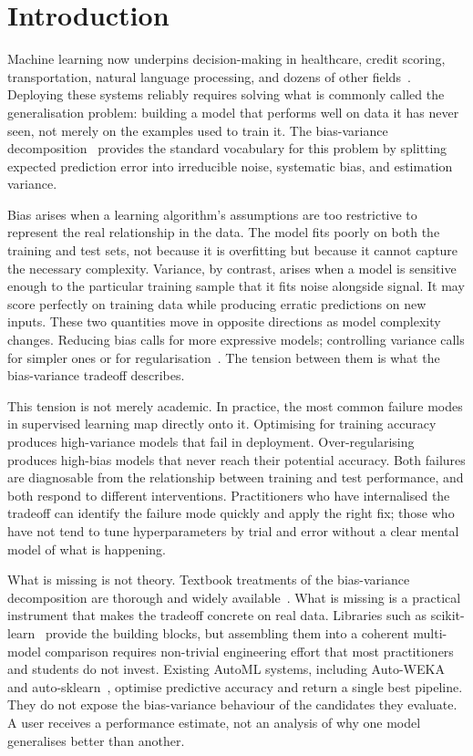 \documentclass[conference]{IEEEtran}
\begin{document}
\section{Introduction}

Machine learning now underpins decision-making in healthcare, credit scoring, transportation, natural language processing, and dozens of other fields~\cite{b26}. Deploying these systems reliably requires solving what is commonly called the generalisation problem: building a model that performs well on data it has never seen, not merely on the examples used to train it. The bias-variance decomposition~\cite{b1} provides the standard vocabulary for this problem by splitting expected prediction error into irreducible noise, systematic bias, and estimation variance.

Bias arises when a learning algorithm's assumptions are too restrictive to represent the real relationship in the data. The model fits poorly on both the training and test sets, not because it is overfitting but because it cannot capture the necessary complexity. Variance, by contrast, arises when a model is sensitive enough to the particular training sample that it fits noise alongside signal. It may score perfectly on training data while producing erratic predictions on new inputs. These two quantities move in opposite directions as model complexity changes. Reducing bias calls for more expressive models; controlling variance calls for simpler ones or for regularisation~\cite{b2}. The tension between them is what the bias-variance tradeoff describes.

This tension is not merely academic. In practice, the most common failure modes in supervised learning map directly onto it. Optimising for training accuracy produces high-variance models that fail in deployment. Over-regularising produces high-bias models that never reach their potential accuracy. Both failures are diagnosable from the relationship between training and test performance, and both respond to different interventions. Practitioners who have internalised the tradeoff can identify the failure mode quickly and apply the right fix; those who have not tend to tune hyperparameters by trial and error without a clear mental model of what is happening.

What is missing is not theory. Textbook treatments of the bias-variance decomposition are thorough and widely available~\cite{b14}. What is missing is a practical instrument that makes the tradeoff concrete on real data. Libraries such as scikit-learn~\cite{b3} provide the building blocks, but assembling them into a coherent multi-model comparison requires non-trivial engineering effort that most practitioners and students do not invest. Existing AutoML systems, including Auto-WEKA~\cite{b4} and auto-sklearn~\cite{b5}, optimise predictive accuracy and return a single best pipeline. They do not expose the bias-variance behaviour of the candidates they evaluate. A user receives a performance estimate, not an analysis of why one model generalises better than another.
\end{document}

